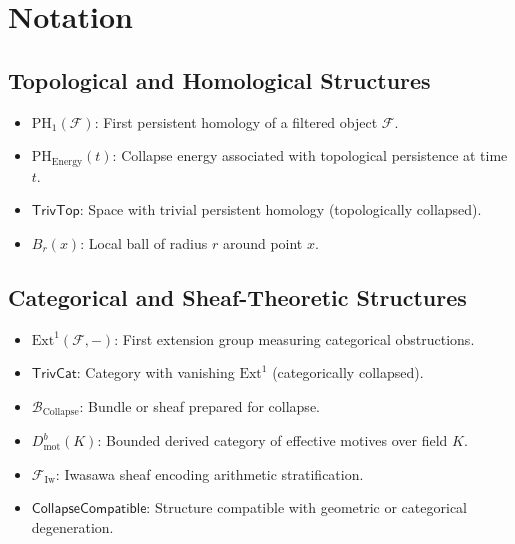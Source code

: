 \documentclass[11pt]{article}
\begin{document}

\section*{Notation}

\subsection*{Topological and Homological Structures}

\begin{itemize}
  \item $\mathrm{PH}_1(\mathcal{F})$: First persistent homology of a filtered object $\mathcal{F}$.
  \item $\mathrm{PH}_{\mathrm{Energy}}(t)$: Collapse energy associated with topological persistence at time $t$.
  \item $\mathsf{TrivTop}$: Space with trivial persistent homology (topologically collapsed).
  \item $B_r(x)$: Local ball of radius $r$ around point $x$.
\end{itemize}

\subsection*{Categorical and Sheaf-Theoretic Structures}

\begin{itemize}
  \item $\mathrm{Ext}^1(\mathcal{F}, -)$: First extension group measuring categorical obstructions.
  \item $\mathsf{TrivCat}$: Category with vanishing $\mathrm{Ext}^1$ (categorically collapsed).
  \item $\mathcal{B}_{\mathrm{Collapse}}$: Bundle or sheaf prepared for collapse.
  \item $D^b_{\mathrm{mot}}(K)$: Bounded derived category of effective motives over field $K$.
  \item $\mathcal{F}_{\mathrm{Iw}}$: Iwasawa sheaf encoding arithmetic stratification.
  \item $\mathsf{CollapseCompatible}$: Structure compatible with geometric or categorical degeneration.
\end{itemize}
\end{document}
